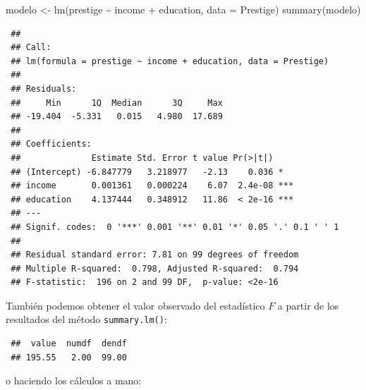 \documentclass[
  10pt,
]{book}
\newenvironment{Shaded}{\begin{snugshade}}{\end{snugshade}}
\newcommand{\AttributeTok}[1]{\textcolor[rgb]{0.77,0.63,0.00}{#1}}
\newcommand{\CommentTok}[1]{\textcolor[rgb]{0.56,0.35,0.01}{\textit{#1}}}
\newcommand{\DecValTok}[1]{\textcolor[rgb]{0.00,0.00,0.81}{#1}}
\newcommand{\FunctionTok}[1]{\textcolor[rgb]{0.00,0.00,0.00}{#1}}
\newcommand{\NormalTok}[1]{#1}
\newcommand{\OtherTok}[1]{\textcolor[rgb]{0.56,0.35,0.01}{#1}}
\newcommand{\SpecialCharTok}[1]{\textcolor[rgb]{0.00,0.00,0.00}{#1}}
\theoremstyle{break}
\theoremstyle{nonumberplain}
\renewcommand{\CommentTok}[1]{\textcolor[rgb]{0.41,0.41,0.41}{\texttt{#1}}}
\begin{document}
\begin{Shaded}
\begin{Highlighting}[]
\NormalTok{modelo }\OtherTok{\textless{}{-}} \FunctionTok{lm}\NormalTok{(prestige }\SpecialCharTok{\textasciitilde{}}\NormalTok{ income }\SpecialCharTok{+}\NormalTok{ education, }\AttributeTok{data =}\NormalTok{ Prestige)}
\FunctionTok{summary}\NormalTok{(modelo)}
\end{Highlighting}
\end{Shaded}

\begin{verbatim}
 ## 
 ## Call:
 ## lm(formula = prestige ~ income + education, data = Prestige)
 ## 
 ## Residuals:
 ##     Min      1Q  Median      3Q     Max 
 ## -19.404  -5.331   0.015   4.980  17.689 
 ## 
 ## Coefficients:
 ##              Estimate Std. Error t value Pr(>|t|)    
 ## (Intercept) -6.847779   3.218977   -2.13    0.036 *  
 ## income       0.001361   0.000224    6.07  2.4e-08 ***
 ## education    4.137444   0.348912   11.86  < 2e-16 ***
 ## ---
 ## Signif. codes:  0 '***' 0.001 '**' 0.01 '*' 0.05 '.' 0.1 ' ' 1
 ## 
 ## Residual standard error: 7.81 on 99 degrees of freedom
 ## Multiple R-squared:  0.798, Adjusted R-squared:  0.794 
 ## F-statistic:  196 on 2 and 99 DF,  p-value: <2e-16
\end{verbatim}

También podemos obtener el valor observado del estadístico \(F\)
a partir de los resultados del método \texttt{summary.lm()}:

\begin{Shaded}
\end{Shaded}

\begin{verbatim}
 ##  value  numdf  dendf 
 ## 195.55   2.00  99.00
\end{verbatim}

o haciendo los cálculos a mano:
\end{document}
